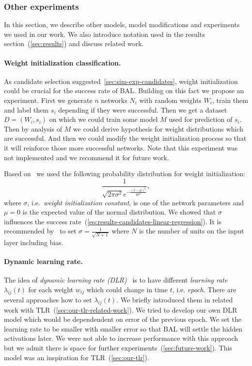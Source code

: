 \subsubsection{Other experiments}

In this section,  we describe other models, model modifications and experiments we used in our work. We also introduce notation used in the results section~(\ref{sec:results}) and discuss related work. 

\paragraph{Weight initialization classification.} 
\label{sec:our-weight-init-class}
As candidate selection suggested~\ref{sec:sim-exp-candidates}, weight initialization could be crucial for the success rate of BAL. Building on this fact we propose an experiment. First we generate $n$ networks $N_i$ with random weights $W_i$, train them and label them $s_i$ depending if they were successful. Then we get a dataset $D=(W_i, s_i)$ on which we could train some model $M$ used for prediction of $s_i$. Then by analysis of $M$ we could derive hypothesis for weight distributions which are successful. And then we could modify the weight initialization process so that it will reinforce those more successful networks. Note that this experiment was not implemented and we recommend it for future work. 


\label{sec:our-sigma} 

Based on~\citet{o1996bio} we used the following probability distribution for weight initialization: 
\begin{equation} 
  \frac{1}{\sqrt{2\pi \sigma^2} e^{-\frac{(x-\mu)^2}{2\sigma^2}}},
  \label{eq:our-sigma} 
\end{equation} 
where $\sigma$, i.e.~\emph{weight initialization constant}, is one of the network parameters and $\mu = 0$ is the expected value of the normal distribution. We showed that $\sigma$ influences the success rate~(\ref{eq:results-candidates-linear-regression}). It is recommended by~\citet{o1996bio} to set $\sigma=\frac{1}{\sqrt{N + 1}}$ where $N$ is the number of units on the input layer including bias.

\paragraph{Dynamic learning rate.} 
\label{sec:our-dynamic-lambda} 
The idea of \emph{dynamic learning rate (DLR)}~\citep{jacobs1988increased} is to have different \emph{learning rate} $\lambda_{ij}(t)$ for each weight $w_{ij}$ which could change in time $t$, i.e. \emph{epoch}. There are several approaches how to set $\lambda_{ij}(t)$. We briefly introduced them in related work with TLR~(\ref{sec:our-tlr-related-work}). We tried to develop our own DLR model which would be dependendent on error of the previous epoch. We set the learning rate to be smaller with smaller error so that BAL will settle the hidden activations later. We were not able to increase performance with this approach but we admit there is space for further experiments~(\ref{sec:future-work}). This model was an inspiration for TLR~(\ref{sec:our-tlr}). 

